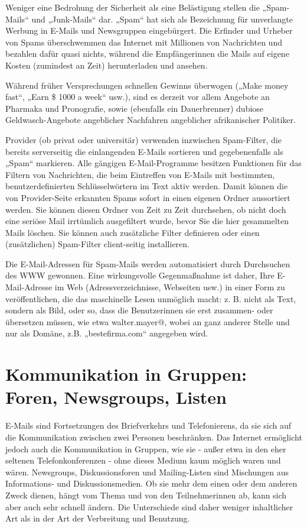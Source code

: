 \documentclass[]{book}
\theoremstyle{definition}
\theoremstyle{definition}
\theoremstyle{definition}
\theoremstyle{remark}
\begin{document}
Weniger eine Bedrohung der Sicherheit als eine Belästigung stellen die
„Spam-Mails`` und „Junk-Mails`` dar. „Spam`` hat sich als Bezeichnung
für unverlangte Werbung in E-Mails und Newsgruppen eingebürgert. Die
Erfinder und Urheber von Spams überschwemmen das Internet mit Millionen
von Nachrichten und bezahlen dafür quasi nichts, während die
Empfängerinnen die Mails auf eigene Kosten (zumindest an Zeit)
herunterladen und ansehen.

Während früher Versprechungen schnellen Gewinns überwogen („Make money
fast``, „Earn \$ 1000 a week`` usw.), sind es derzeit vor allem Angebote
an Pharmaka und Pronografie, sowie (ebenfalls ein Dauerbrenner) dubiose
Geldwasch-Angebote angeblicher Nachfahren angeblicher afrikanischer
Politiker.

Provider (ob privat oder universitär) verwenden inzwischen Spam-Filter,
die bereits serverseitig die einlangenden E-Mails sortieren und
gegebenenfalls als „Spam`` markieren. Alle gängigen E-Mail-Programme
besitzen Funktionen für das Filtern von Nachrichten, die beim Eintreffen
von E-Mails mit bestimmten, benutzerdefinierten Schlüsselwörtern im Text
aktiv werden. Damit können die von Provider-Seite erkannten Spams sofort
in einen eigenen Ordner aussortiert werden. Sie können diesen Ordner von
Zeit zu Zeit durchsehen, ob nicht doch eine seriöse Mail irrtümlich
ausgefiltert wurde, bevor Sie die hier gesammelten Mails löschen. Sie
können auch zusätzliche Filter definieren oder einen (zusätzlichen)
Spam-Filter client-seitig installieren.

Die E-Mail-Adressen für Spam-Mails werden automatisiert durch
Durchsuchen des WWW gewonnen. Eine wirkungsvolle Gegenmaßnahme ist
daher, Ihre E-Mail-Adresse im Web (Adressverzeichnisse, Webseiten usw.)
in einer Form zu veröffentlichen, die das maschinelle Lesen unmöglich
macht: z. B. nicht als Text, sondern als Bild, oder so, dass die
Benutzerinnen sie erst zusammen- oder übersetzen müssen, wie etwa
walter.mayer@, wobei an ganz anderer Stelle und nur als Domäne, z.B.
„bestefirma.com`` angegeben wird.

\section{Kommunikation in Gruppen: Foren, Newsgroups,
Listen}\label{kommunikation-in-gruppen-foren-newsgroups-listen}

E-Mails sind Fortsetzungen des Briefverkehrs und Telefonierens, da sie
sich auf die Kommunikation zwischen zwei Personen beschränken. Das
Internet ermöglicht jedoch auch die Kommunikation in Gruppen, wie sie -
außer etwa in den eher seltenen Telefonkonferenzen - ohne dieses Medium
kaum möglich waren und wären. Newsgroups, Diskussionsforen und
Mailing-Listen sind Mischungen aus Informations- und Diskussionsmedien.
Ob sie mehr dem einen oder dem anderen Zweck dienen, hängt vom Thema und
von den Teilnehmerinnen ab, kann sich aber auch sehr schnell ändern. Die
Unterschiede sind daher weniger inhaltlicher Art als in der Art der
Verbreitung und Benutzung.
\end{document}
